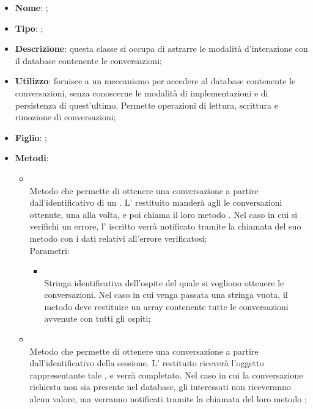 \begin{itemize}
	\item \textbf{Nome}: ;
	\item \textbf{Tipo}: ;
	\item \textbf{Descrizione}: questa classe si occupa di astrarre le modalità d'interazione con il database contenente le conversazioni;
	\item \textbf{Utilizzo}: fornisce a  un meccanismo per accedere al database contenente le conversazioni, senza conoscerne le modalità di implementazioni e di persistenza di quest'ultimo. Permette operazioni di lettura, scrittura e rimozione di conversazioni;
	\item \textbf{Figlio}: ;
	\item \textbf{Metodi}:
	\begin{itemize}
		\item[]  \\
		Metodo che permette di ottenere una conversazione a partire dall'identificativo di un . L' restituito manderà agli  le conversazioni ottenute, una alla volta, e poi chiama il loro metodo . Nel caso in cui si verifichi un errore, l' iscritto verrà notificato tramite la chiamata del suo metodo  con i dati relativi all'errore verificatosi;\\
		Parametri:
		\begin{itemize}
			\item {} \\
			Stringa identificativa dell'ospite del quale si vogliono ottenere le conversazioni. Nel caso in cui venga passata una stringa vuota, il metodo deve restituire un array contenente tutte le conversazioni avvenute con tutti gli ospiti;
		\end{itemize}
		\item[]  \\
		Metodo che permette di ottenere una conversazione a partire dall'identificativo della sessione. L' restituito riceverà l'oggetto rappresentante tale , e verrà completato. Nel caso in cui la conversazione richiesta non sia presente nel database, gli  interessati non riceveranno alcun valore, ma verranno notificati tramite la chiamata del loro metodo ;\\

\end{itemize}
\end{itemize}

